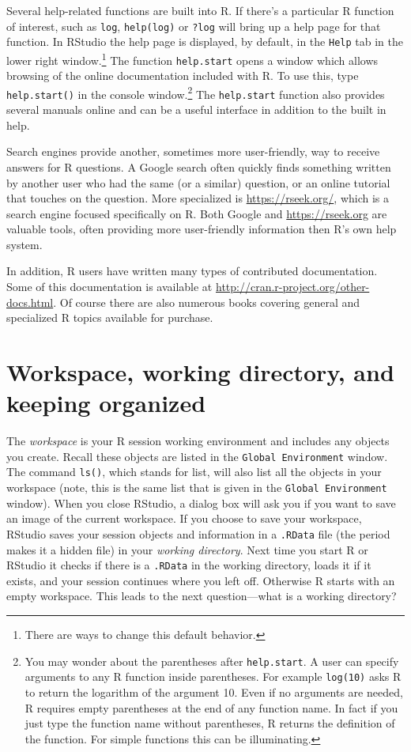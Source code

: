 \documentclass[]{krantz}
\begin{document}
Several help-related functions are built into R. If there's a particular R function of interest, such as \texttt{log}, \texttt{help(log)} or \texttt{?log} will bring up a help page for that function. In RStudio the help page is displayed, by default, in the \texttt{Help} tab in the lower right window.\footnote{There are ways to change this default behavior.} The function \texttt{help.start} opens a window which allows browsing of the online documentation included with R. To use this, type \texttt{help.start()} in the console window.\footnote{You may wonder about the parentheses after \texttt{help.start}. A user can specify arguments to any R function inside parentheses. For example \texttt{log(10)} asks R to return the logarithm of the argument 10. Even if no arguments are needed, R requires empty parentheses at the end of any function name. In fact if you just type the function name without parentheses, R returns the definition of the function. For simple functions this can be illuminating.} The \texttt{help.start} function also provides several manuals online and can be a useful interface in addition to the built in help.

Search engines provide another, sometimes more user-friendly, way to receive answers for R questions. A Google search often quickly finds something written by another user who had the same (or a similar) question, or an online tutorial that touches on the question. More specialized is \url{https://rseek.org/}, which is a search engine focused specifically on R. Both Google and \url{https://rseek.org} are valuable tools, often providing more user-friendly information then R's own help system.

In addition, R users have written many types of contributed documentation. Some of this documentation is available at \url{http://cran.r-project.org/other-docs.html}. Of course there are also numerous books covering general and specialized R topics available for purchase.

\hypertarget{workspace-working-directory-and-keeping-organized}{%
\section{Workspace, working directory, and keeping organized}\label{workspace-working-directory-and-keeping-organized}}

The \emph{workspace} is your R session working environment and includes any objects you create. Recall these objects are listed in the \texttt{Global\ Environment} window. The command \texttt{ls()}, which stands for list, will also list all the objects in your workspace (note, this is the same list that is given in the \texttt{Global\ Environment} window). When you close RStudio, a dialog box will ask you if you want to save an image of the current workspace. If you choose to save your workspace, RStudio saves your session objects and information in a \texttt{.RData} file (the period makes it a hidden file) in your \emph{working directory}. Next time you start R or RStudio it checks if there is a \texttt{.RData} in the working directory, loads it if it exists, and your session continues where you left off. Otherwise R starts with an empty workspace. This leads to the next question---what is a working directory?
\end{document}
